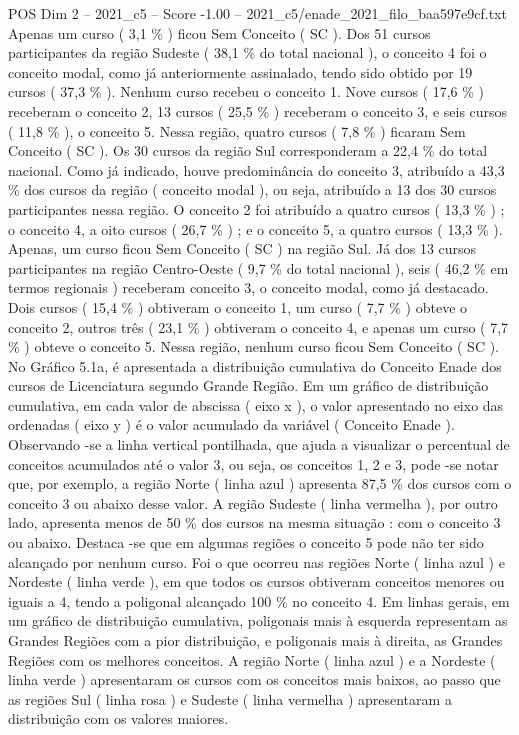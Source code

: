 \begin{textsample}{POS Dim 2 – 2021\_c5 – Score -1.00 – 2021\_c5/enade\_2021\_filo\_baa597e9cf.txt}
Apenas um curso ( 3,1 \% ) ficou Sem Conceito ( SC ).
Dos 51 cursos participantes da região Sudeste ( 38,1 \% do total nacional ), o conceito 4 foi o conceito modal, como já anteriormente assinalado, tendo sido obtido por 19 cursos ( 37,3 \% ).
Nenhum curso recebeu o conceito 1.
Nove cursos ( 17,6 \% ) receberam o conceito 2, 13 cursos ( 25,5 \% ) receberam o conceito 3, e seis cursos ( 11,8 \% ), o conceito 5.
Nessa região, quatro cursos ( 7,8 \% ) ficaram Sem Conceito ( SC ).
Os 30 cursos da região Sul corresponderam a 22,4 \% do total nacional.
Como já indicado, houve predominância do conceito 3, atribuído a 43,3 \% dos cursos da região ( conceito modal ), ou seja, atribuído a 13 dos 30 cursos participantes nessa região.
O conceito 2 foi atribuído a quatro cursos ( 13,3 \% ) ; o conceito 4, a oito cursos ( 26,7 \% ) ; e o conceito 5, a quatro cursos ( 13,3 \% ).
Apenas, um curso ficou Sem Conceito ( SC ) na região Sul.
Já dos 13 cursos participantes na região Centro-Oeste ( 9,7 \% do total nacional ), seis ( 46,2 \% em termos regionais ) receberam conceito 3, o conceito modal, como já destacado.
Dois cursos ( 15,4 \% ) obtiveram o conceito 1, um curso ( 7,7 \% ) obteve o conceito 2, outros três ( 23,1 \% ) obtiveram o conceito 4, e apenas um curso ( 7,7 \% ) obteve o conceito 5.
Nessa região, nenhum curso ficou Sem Conceito ( SC ).
No Gráfico 5.1a, é apresentada a distribuição cumulativa do Conceito Enade dos cursos de Licenciatura segundo Grande Região.
Em um gráfico de distribuição cumulativa, em cada valor de abscissa ( eixo x ), o valor apresentado no eixo das ordenadas ( eixo y ) é o valor acumulado da variável ( Conceito Enade ).
Observando -se a linha vertical pontilhada, que ajuda a visualizar o percentual de conceitos acumulados até o valor 3, ou seja, os conceitos 1, 2 e 3, pode -se notar que, por exemplo, a região Norte ( linha azul ) apresenta 87,5 \% dos cursos com o conceito 3 ou abaixo desse valor.
A região Sudeste ( linha vermelha ), por outro lado, apresenta menos de 50 \% dos cursos na mesma situação : com o conceito 3 ou abaixo.
Destaca -se que em algumas regiões o conceito 5 pode não ter sido alcançado por nenhum curso.
Foi o que ocorreu nas regiões Norte ( linha azul ) e Nordeste ( linha verde ), em que todos os cursos obtiveram conceitos menores ou iguais a 4, tendo a poligonal alcançado 100 \% no conceito 4.
Em linhas gerais, em um gráfico de distribuição cumulativa, poligonais mais à esquerda representam as Grandes Regiões com a pior distribuição, e poligonais mais à direita, as Grandes Regiões com os melhores conceitos.
A região Norte ( linha azul ) e a Nordeste ( linha verde ) apresentaram os cursos com os conceitos mais baixos, ao passo que as regiões Sul ( linha rosa ) e Sudeste ( linha vermelha ) apresentaram a distribuição com os valores maiores.

\end{textsample}
